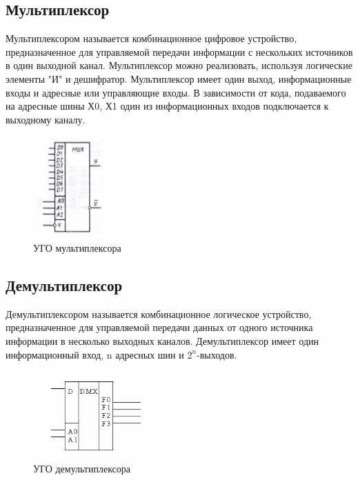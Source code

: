 \documentclass[unicode, 12pt, a4paper, oneside]{article}
\begin{document}
\subsection*{Мультиплексор}

Мультиплексором называется комбинационное цифровое устройство, предназначенное для управляемой передачи информации с нескольких источников в один выходной канал. Мультиплексор можно реализовать, используя логические элементы "И" и дешифратор. Мультиплексор имеет один выход, информационные входы и адресные или управляющие входы. В зависимости от кода, подаваемого на адресные шины Х0, Х1 один из информационных входов подключается к выходному каналу.
\begin{figure}[H]
\centering
\includegraphics[width=0.25\textwidth]{11_ms.jpg}
\caption{УГО мультиплексора}
\label{fig:11_ms}
\end{figure}

\subsection*{Демультиплексор}

Демультиплексором называется комбинационное логическое устройство, предназначенное для управляемой передачи данных от одного источника информации в несколько выходных каналов. Демультиплексор имеет один информационный вход, n адресных шин и $2^{n}$-выходов.
\begin{figure}[H]
\centering
\includegraphics[width=0.45\textwidth]{11_dmx.png}
\caption{УГО демультиплексора}
\label{fig:11_dmx}
\end{figure}


\end{document}
